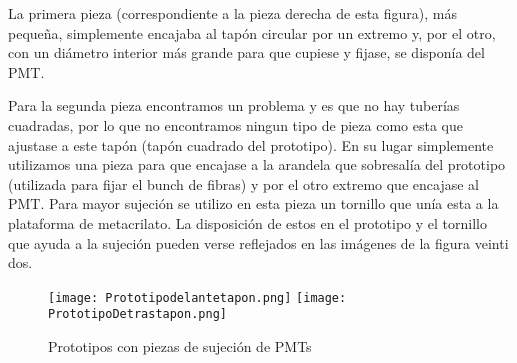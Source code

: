La primera pieza (correspondiente a la pieza derecha de esta figura), más pequeña, simplemente encajaba al tapón circular por un extremo y, por el otro, con un diámetro interior más grande para que cupiese y fijase, se disponía del PMT.

Para la segunda pieza encontramos un problema y es que no hay tuberías cuadradas, por lo que no encontramos ningun tipo de pieza como esta que ajustase a este tapón (tapón cuadrado del prototipo). En su lugar simplemente utilizamos una pieza para que encajase a la arandela que sobresalía del prototipo (utilizada para fijar el bunch de fibras) y por el otro extremo que encajase al PMT. Para mayor sujeción se utilizo en esta pieza un tornillo que unía esta a la plataforma de metacrilato. La disposición de estos en el prototipo y el tornillo que ayuda a la sujeción pueden verse reflejados en las imágenes de la figura veinti dos.

\begin{figure}[htb]
\centering
{
\texttt{[image: Prototipodelantetapon.png]} 
}
{
\texttt{[image: PrototipoDetrastapon.png]} 
}
\caption{Prototipos con piezas de sujeción de PMTs}
\end{figure} 


